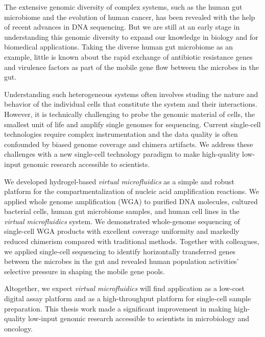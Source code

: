 % 
% 
%
The extensive genomic diversity of complex systems, such as the human gut microbiome and the evolution of human cancer, has been revealed with the help of recent advances in DNA sequencing. But we are still at an early stage in understanding this genomic diversity to expand our knowledge in biology and for biomedical applications. Taking the diverse human gut microbiome as an example, little is known about the rapid exchange of antibiotic resistance genes and virulence factors as part of the mobile gene flow between the microbes in the gut.

Understanding such heterogeneous systems often involves studing the nature and behavior of the individual cells that constitute the system and their interactions. However, it is technically challenging to probe the genomic material of cells, the smallest unit of life and amplify single genomes for sequencing. Current single-cell technologies require complex instrumentation and the data quality is often confounded by biased genome coverage and chimera artifacts. We address these challenges with a new single-cell technology paradigm to make high-quality low-input genomic research accessible to scientists. 

We developed hydrogel-based \textit{virtual microfluidics} as a simple and robust platform for the compartmentalization of nucleic acid amplification reactions. We applied whole genome amplification (WGA) to purified DNA molecules, cultured bacterial cells, human gut microbiome samples, and human cell lines in the \textit{virtual microfluidics} system. We demonstrated whole-genome sequencing of single-cell WGA products with excellent coverage uniformity and markedly reduced chimerism compared with traditional methods. Together with colleagues, we applied single-cell sequencing to identify horizontally transferred genes between the microbes in the gut and revealed human population activities' selective pressure in shaping the mobile gene pools. 

Altogether, we expect \textit{virtual microfluidics} will find application as a low-cost digital assay platform and as a high-throughput platform for single-cell sample preparation. This thesis work made a significant improvement in making high-quality low-input genomic research accessible to scientists in microbiology and oncology. 
